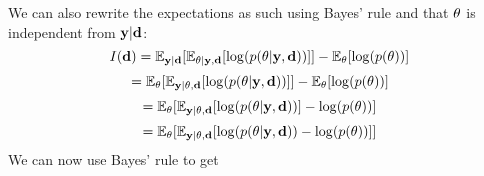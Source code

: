 We can also rewrite the expectations as such using Bayes' rule and that $\mathbf{\theta}$ is independent from $\mathbf{y}|\mathbf{d}$:
\begin{equation}\label{eq:mi}I(\mathbf{d})  = \mathbb{E}_{\mathbf{y}|\mathbf{d}}[\mathbb{E}_{\theta| \mathbf{y}, \mathbf{d}} [\log(p(\theta | \mathbf{y}, \mathbf{d}))]] - \mathbb{E}_{\theta}[\log(p(\theta))]\end{equation}
\begin{equation}= \mathbb{E}_{\mathbf{\theta}}[\mathbb{E}_{\mathbf{y}| \theta, \mathbf{d}} [\log(p(\theta | \mathbf{y}, \mathbf{d}))]] - \mathbb{E}_{\theta}[\log(p(\theta))]\end{equation}
\begin{equation}= \mathbb{E}_{\mathbf{\theta}}[\mathbb{E}_{\mathbf{y}| \theta, \mathbf{d}} [\log(p(\theta | \mathbf{y}, \mathbf{d}))] - \log(p(\theta))]\end{equation}
\begin{equation}= \mathbb{E}_{\mathbf{\theta}}[\mathbb{E}_{\mathbf{y}| \theta, \mathbf{d}} [\log(p(\theta | \mathbf{y}, \mathbf{d})) - \log(p(\theta))]]\end{equation}
We can now use Bayes' rule to get

